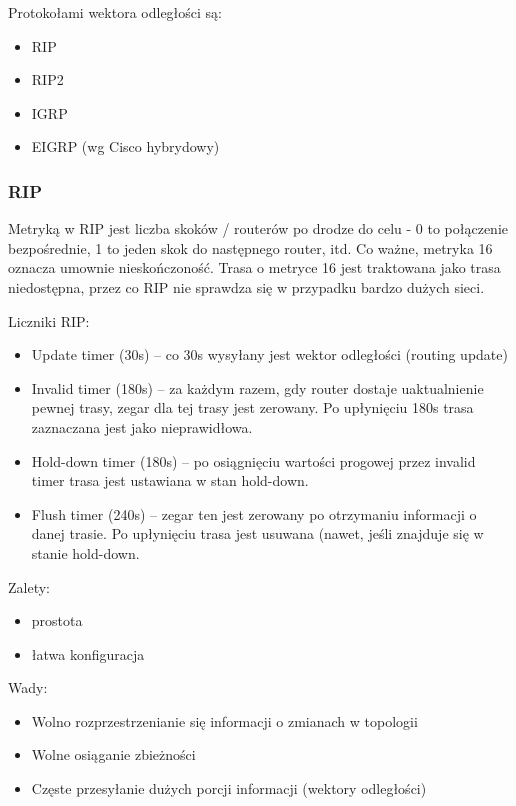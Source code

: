 \documentclass[main.tex]{subfiles}
\begin{document}
    Protokołami wektora odległości są:
    \begin{itemize}
        \item RIP
        \item RIP2
        \item IGRP
        \item EIGRP (wg Cisco hybrydowy)
    \end{itemize}

    \subsubsection{RIP}
    Metryką w RIP jest liczba skoków / routerów po drodze do celu - 0 to połączenie bezpośrednie, 1 to jeden skok do następnego router, itd. Co ważne, metryka 16
    oznacza umownie nieskończoność. Trasa o metryce 16 jest traktowana jako trasa niedostępna, przez co RIP nie sprawdza się w przypadku bardzo dużych sieci.

    Liczniki RIP:
    \begin{itemize}
        \item Update timer (30s) – co 30s wysyłany jest wektor odległości (routing update)
        \item Invalid timer (180s) – za każdym razem, gdy router dostaje uaktualnienie pewnej trasy, zegar dla tej trasy jest zerowany. Po upłynięciu 180s trasa zaznaczana jest jako nieprawidłowa.
        \item Hold-down timer (180s) – po osiągnięciu wartości progowej przez invalid timer trasa jest ustawiana w stan hold-down.
        \item Flush timer (240s) – zegar ten jest zerowany po otrzymaniu informacji o danej trasie. Po upłynięciu trasa jest usuwana (nawet, jeśli znajduje się w stanie hold-down.
    \end{itemize}

    Zalety:
    \begin{itemize}
        \item prostota
        \item łatwa konfiguracja
    \end{itemize}

    Wady:
    \begin{itemize}
        \item Wolno rozprzestrzenianie się informacji o zmianach w topologii
        \item Wolne osiąganie zbieżności
        \item Częste przesyłanie dużych porcji informacji (wektory odległości)
    \end{itemize}
\end{document}
